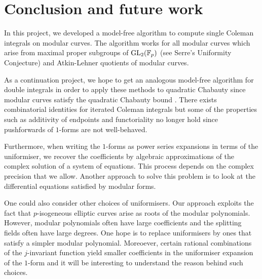\section{Conclusion and future work}

In this project, we developed a model-free algorithm to compute single Coleman integrals on modular curves. The algorithm works for all modular curves which arise from maximal proper subgroups of $\operatorname{GL}_2(\mathbb{F}_p)$ (see Serre's Uniformity Conjecture) and Atkin-Lehner quotients of modular curves.

As a continuation project, we hope to get an analogous model-free algorithm for double integrals in order to apply these methods to quadratic Chabauty since modular curves satisfy the quadratic Chabauty bound \cite{Siksek}. There exists combinatorial identities for iterated Coleman integrals but some of the properties such as additivity of endpoints and functoriality no longer hold since pushforwards of $1$-forms are not well-behaved.

Furthermore, when writing the $1$-forms as power series expansions in terms of the uniformiser, we recover the coefficients by algebraic approximations of the complex solution of a system of equations. This process depends on the complex precision that we allow. Another approach to solve this problem is to look at the differential equations satisfied by modular forms.

One could also consider other choices of uniformisers. Our approach exploits the fact that $p$-isogeneous elliptic curves arise as roots of the modular polynomials. However, modular polynomials often have large coefficients and the splitting fields often have large degrees. One hope is to replace uniformisers by ones that satisfy a simpler modular polynomial. Moreoever, certain rational combinations of the $j$-invariant function yield smaller coefficients in the uniformiser expansion of the $1$-form and it will be interesting to understand the reason behind such choices.